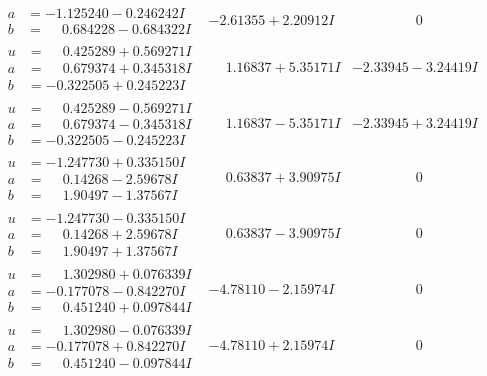 \documentclass[1p]{elsarticle_modified}
\theoremstyle{definition}
\begin{document}
$$\begin{array}{c|c|c}
\begin{aligned}
a &= -1.125240 - 0.246242 I \\
b &= \phantom{-}0.684228 - 0.684322 I\end{aligned}
 & -2.61355 + 2.20912 I & \phantom{-0.000000 } 0 \\ \hline\begin{aligned}
u &= \phantom{-}0.425289 + 0.569271 I \\
a &= \phantom{-}0.679374 + 0.345318 I \\
b &= -0.322505 + 0.245223 I\end{aligned}
 & \phantom{-}1.16837 + 5.35171 I & -2.33945 - 3.24419 I \\ \hline\begin{aligned}
u &= \phantom{-}0.425289 - 0.569271 I \\
a &= \phantom{-}0.679374 - 0.345318 I \\
b &= -0.322505 - 0.245223 I\end{aligned}
 & \phantom{-}1.16837 - 5.35171 I & -2.33945 + 3.24419 I \\ \hline\begin{aligned}
u &= -1.247730 + 0.335150 I \\
a &= \phantom{-}0.14268 - 2.59678 I \\
b &= \phantom{-}1.90497 - 1.37567 I\end{aligned}
 & \phantom{-}0.63837 + 3.90975 I & \phantom{-0.000000 } 0 \\ \hline\begin{aligned}
u &= -1.247730 - 0.335150 I \\
a &= \phantom{-}0.14268 + 2.59678 I \\
b &= \phantom{-}1.90497 + 1.37567 I\end{aligned}
 & \phantom{-}0.63837 - 3.90975 I & \phantom{-0.000000 } 0 \\ \hline\begin{aligned}
u &= \phantom{-}1.302980 + 0.076339 I \\
a &= -0.177078 - 0.842270 I \\
b &= \phantom{-}0.451240 + 0.097844 I\end{aligned}
 & -4.78110 - 2.15974 I & \phantom{-0.000000 } 0 \\ \hline\begin{aligned}
u &= \phantom{-}1.302980 - 0.076339 I \\
a &= -0.177078 + 0.842270 I \\
b &= \phantom{-}0.451240 - 0.097844 I\end{aligned}
 & -4.78110 + 2.15974 I & \phantom{-0.000000 } 0\\

\end{array}$$
\end{document}
